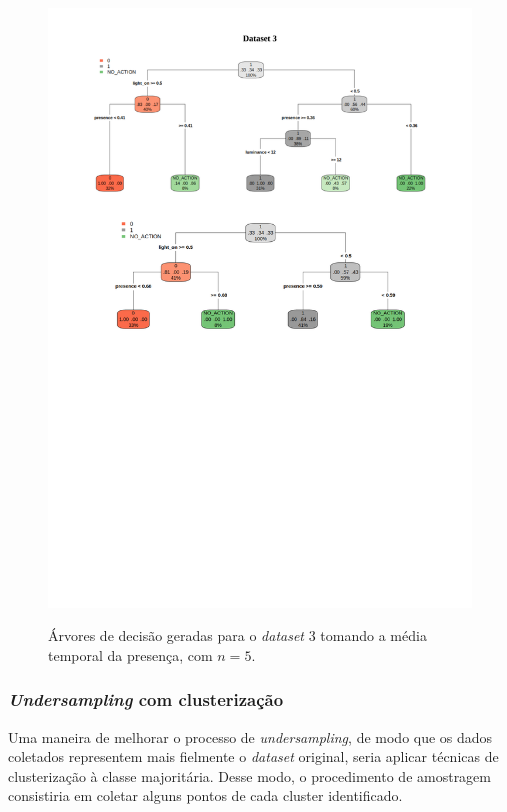 \begin{figure}[hp]
	\centering
	\caption{Árvores de decisão geradas para o \textit{dataset} 3 tomando a média temporal da presença, com $n=5$.}
  \includegraphics[width=\textwidth]{imagens/teste_learning/5_3.pdf}
  \label{fig:teste_5_3}  
\end{figure}

\clearpage

\subsubsection{\textit{Undersampling} com clusterização}
Uma maneira de melhorar o processo de \textit{undersampling}, de modo que os dados coletados representem mais fielmente o \textit{dataset} original, seria aplicar técnicas de clusterização à classe majoritária. Desse modo, o procedimento de amostragem consistiria em coletar alguns pontos de cada cluster identificado.

